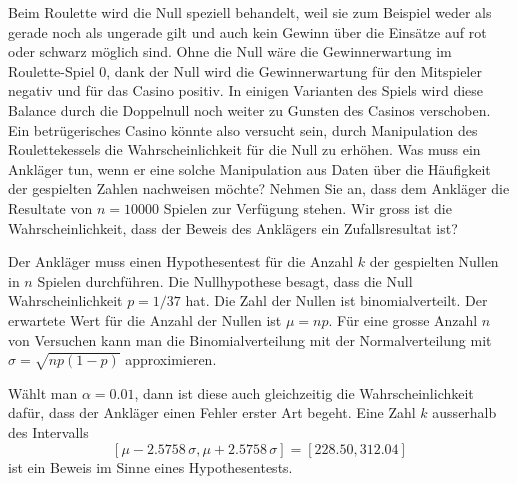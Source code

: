 Beim Roulette wird die Null speziell behandelt, weil sie zum Beispiel
weder als gerade noch als ungerade gilt und auch kein Gewinn über
die Einsätze auf rot oder schwarz möglich sind.
Ohne die Null wäre die Gewinnerwartung im Roulette-Spiel 0,
dank der Null wird die Gewinnerwartung für den Mitspieler negativ
und für das Casino positiv. 
In einigen Varianten des Spiels wird diese Balance durch die Doppelnull
noch weiter zu Gunsten des Casinos verschoben.
Ein betrügerisches Casino könnte also versucht sein, durch Manipulation
des Roulettekessels die Wahrscheinlichkeit für die Null zu erhöhen.
Was muss ein Ankläger tun, wenn er eine solche Manipulation
aus Daten über die Häufigkeit der gespielten Zahlen nachweisen möchte?
Nehmen Sie an, dass dem Ankläger die Resultate von $n=10000$ Spielen
zur Verfügung stehen.
Wir gross ist die Wahrscheinlichkeit, dass der Beweis des Anklägers
ein Zufallsresultat ist?


\begin{loesung}
Der Ankläger muss einen Hypothesentest für die Anzahl $k$ der gespielten
Nullen in $n$ Spielen durchführen.
Die Nullhypothese besagt, dass die Null Wahrscheinlichkeit $p=1/37$ hat.
Die Zahl der Nullen ist binomialverteilt.
Der erwartete Wert für die Anzahl der Nullen ist $\mu=np$.
Für eine grosse Anzahl $n$ von Versuchen kann man die Binomialverteilung
mit der Normalverteilung mit $\sigma = \sqrt{np(1-p)}$ 
approximieren.

Wählt man $\alpha=0.01$, dann ist diese auch gleichzeitig die
Wahrscheinlichkeit dafür, dass der Ankläger einen Fehler erster Art
begeht.
Eine Zahl $k$ ausserhalb des Intervalls
\[
[ \mu - 2.5758\,\sigma, \mu + 2.5758\,\sigma]
=
[228.50, 312.04]
\]
ist ein Beweis im Sinne eines Hypothesentests.
\end{loesung}


